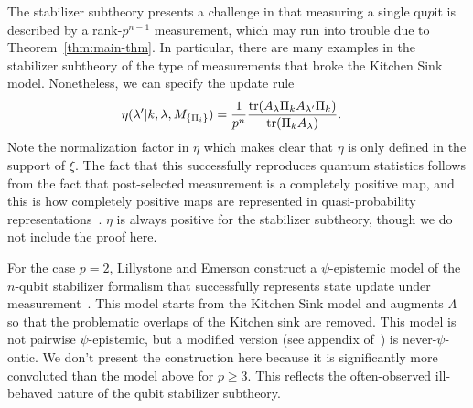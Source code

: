 \documentclass[%
 reprint, onecolumn, 12pt,
superscriptaddress,
nofootinbib,
 prx, 
]{quantumarticle}
\begin{document}
The stabilizer subtheory presents a challenge in that measuring a
single qu$p$it is described by a rank-$p^{n-1}$ measurement, which may
run into trouble due to Theorem~\ref{thm:main-thm}. In particular,
there are many examples in the stabilizer subtheory of the type of
measurements that broke the Kitchen Sink model. Nonetheless, we can
specify the update rule
\begin{align}
  \eta(\lambda'|k,\lambda,M_{\{\Pi_i\}}) &= \frac{1}{p^n}\frac{\tr(A_\lambda\Pi_k A_{\lambda'}\Pi_k)}{\tr(\Pi_kA_\lambda)}.
\end{align}
Note the normalization factor in $\eta$ which makes clear that $\eta$
is only defined in the support of $\xi$. The fact that this
successfully reproduces quantum statistics follows from the fact that
post-selected measurement is a completely positive map, and this is
how completely positive maps are represented in quasi-probability
representations~\cite{FerrieQuasiprobabilityrepresentationsquantum2011}.
$\eta$ is always positive for the stabilizer subtheory, though we do
not include the proof here.
 
For the case $p=2$, Lillystone and Emerson construct a 
$\psi$-epistemic model of the $n$-qubit stabilizer formalism that
successfully represents state update under
measurement~\cite{LillystoneContextualpsEpistemicModel2019}. This model starts
from the Kitchen Sink model and augments $\Lambda$ so that the
problematic overlaps of the Kitchen sink are removed. This model is
not pairwise $\psi$-epistemic, but a modified version (see appendix
of~\cite{LillystoneContextualpsEpistemicModel2019}) is never-$\psi$-ontic. We
don't present the construction here because it is significantly more
convoluted than the model above for $p\geq3$. This reflects the
often-observed ill-behaved nature of the qubit stabilizer subtheory.
\end{document}

